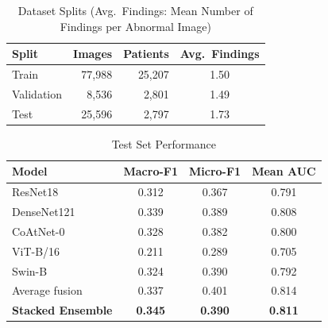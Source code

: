 \begin{table}[t]
\caption{Dataset Splits (Avg.\ Findings: Mean Number of Findings per Abnormal Image)}
\label{tab:splits}
\centering
\begin{tabular}{lrrc}
\toprule
Split & Images & Patients & Avg.\ Findings \\
\midrule
Train & 77,988 & 25,207 & 1.50 \\
Validation & 8,536 & 2,801 & 1.49 \\
Test & 25,596 & 2,797 & 1.73 \\
\bottomrule
\end{tabular}
\end{table}

\begin{table}[t]
\caption{Test Set Performance}
\label{tab:test}
\centering
\begin{tabular}{lccc}
\toprule
Model & Macro-F1 & Micro-F1 & Mean AUC \\
\midrule
ResNet18 & 0.312 & 0.367 & 0.791 \\
DenseNet121 & 0.339 & 0.389 & 0.808 \\
CoAtNet-0 & 0.328 & 0.382 & 0.800 \\
ViT-B/16 & 0.211 & 0.289 & 0.705 \\
Swin-B & 0.324 & 0.390 & 0.792 \\
\midrule
Average fusion & 0.337 & 0.401 & 0.814 \\
\textbf{Stacked Ensemble} & \textbf{0.345} & \textbf{0.390} & \textbf{0.811} \\
\bottomrule
\end{tabular}
\end{table}

